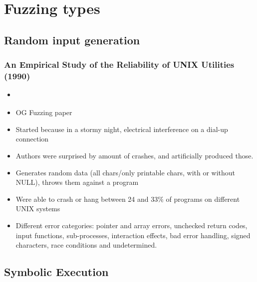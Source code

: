 \documentclass[12pt]{article}
\begin{document}
\section{Fuzzing types}
\subsection{Random input generation}
\subsubsection{An Empirical Study of the Reliability of UNIX Utilities (1990)}
\begin{itemize}
    \item \cite{UNIX}
    \item OG Fuzzing paper
    \item Started because in a stormy night, electrical interference on a dial-up connection
    \item Authors were surprised by amount of crashes, and artificially produced those.
    \item Generates random data (all chars/only printable chars, with or without NULL), throws them against a program
    \item Were able to crash or hang between 24 and 33\% of programs on different UNIX systems
    \item Different error categories: pointer and array errors, unchecked return codes, input functions, sub-processes, interaction effects, bad error handling, signed characters, race conditions and undetermined.
\end{itemize}

\subsection{Symbolic Execution}
\end{document}
